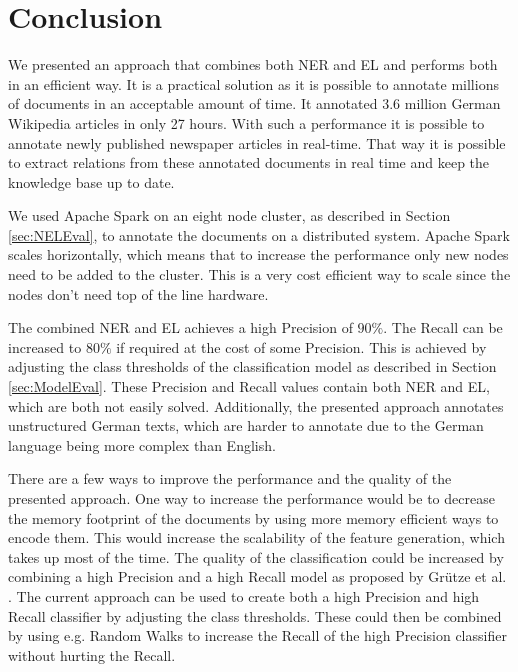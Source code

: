 \section{Conclusion}
\label{sec:Conclusion}
We presented an approach that combines both NER and EL and performs both in an efficient way. It is a practical solution as it is possible to annotate millions of documents in an acceptable amount of time. It annotated 3.6 million German Wikipedia articles in only 27 hours. With such a performance it is possible to annotate newly published newspaper articles in real-time. That way it is possible to extract relations from these annotated documents in real time and keep the knowledge base up to date.\par
We used Apache Spark on an eight node cluster, as described in Section \ref{sec:NELEval}, to annotate the documents on a distributed system. Apache Spark scales horizontally, which means that to increase the performance only new nodes need to be added to the cluster. This is a very cost efficient way to scale since the nodes don't need top of the line hardware.\par
The combined NER and EL achieves a high Precision of $90\%$. The Recall can be increased to $80\%$ if required at the cost of some Precision. This is achieved by adjusting the class thresholds of the classification model as described in Section \ref{sec:ModelEval}. These Precision and Recall values contain both NER and EL, which are both not easily solved. Additionally, the presented approach annotates unstructured German texts, which are harder to annotate due to the German language being more complex than English.\par
There are a few ways to improve the performance and the quality of the presented approach. One way to increase the performance would be to decrease the memory footprint of the documents by using more memory efficient ways to encode them. This would increase the scalability of the feature generation, which takes up most of the time. The quality of the classification could be increased by combining a high Precision and a high Recall model as proposed by Grütze et al. \cite{coheel}. The current approach can be used to create both a high Precision and high Recall classifier by adjusting the class thresholds. These could then be combined by using e.g. Random Walks to increase the Recall of the high Precision classifier without hurting the Recall.


